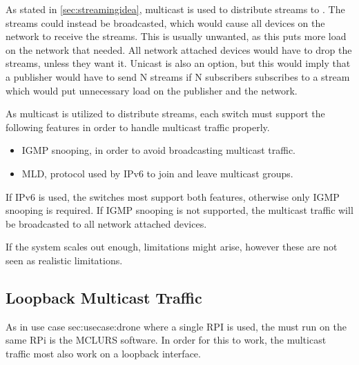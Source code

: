 As stated in \ref{sec:streamingidea}, multicast is used to distribute streams to . The streams could instead be broadcasted, which would cause all devices on the network to receive the streams. This is usually unwanted, as this puts more load on the network that needed. All network attached devices would have to drop the streams, unless they want it. Unicast is also an option, but this would imply that a publisher would have to send N streams if N subscribers subscribes to a stream which would put unnecessary load on the publisher and the network.

As multicast is utilized to distribute streams, each switch must support the following features in order to handle multicast traffic properly.

\begin{itemize}
	 \item IGMP snooping, in order to avoid broadcasting multicast traffic.
	 \item MLD, protocol used by IPv6 to join and leave multicast groups.
\end{itemize}
If IPv6 is used, the switches most support both features, otherwise only IGMP snooping is required. If IGMP snooping is not supported, the multicast traffic will be broadcasted to all network attached devices.

If the system scales out enough, limitations might arise, however these are not seen as realistic limitations.

\subsection{Loopback Multicast Traffic} \label{sec:analysis:localmulticasttrafic}
As in use case \refname{sec:usecase:drone} where a single RPI is used, the  must run on the same RPi is the \ac{MCLURS} software. In order for this to work, the multicast traffic most also work on a loopback interface. 

